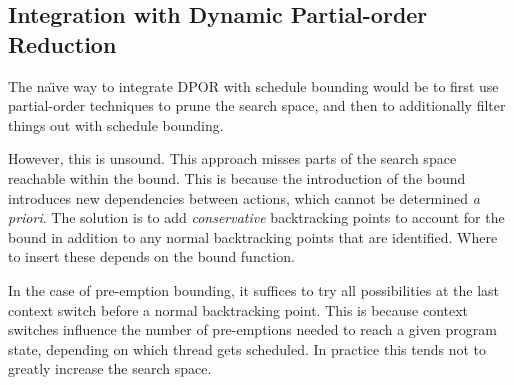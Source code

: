 \subsection{Integration with Dynamic Partial-order Reduction}

The na\"{\i}ve way to integrate DPOR with schedule bounding would be
to first use partial-order techniques to prune the search space, and
then to additionally filter things out with schedule bounding.

However, this is unsound.  This approach misses parts of the search space
reachable within the bound.  This is because the introduction of the bound
introduces new dependencies between actions, which cannot be determined \emph{a
  priori}.  The solution is to add \emph{conservative} backtracking points to
account for the bound in addition to any normal backtracking points that are
identified.  Where to insert these depends on the bound function.

In the case of pre-emption bounding, it suffices to try all possibilities at the
last context switch before a normal backtracking point.  This is because context
switches influence the number of pre-emptions needed to reach a given program
state, depending on which thread gets scheduled.  In practice this tends not to
greatly increase the search space.
